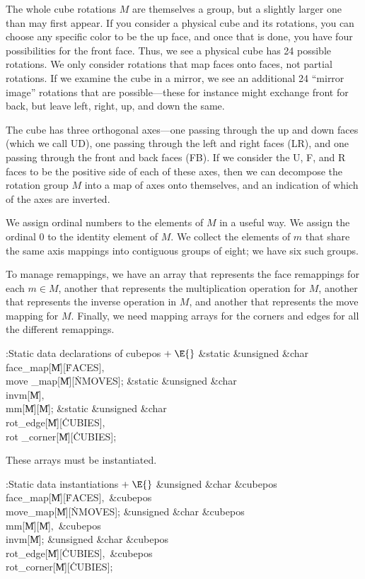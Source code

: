 The whole cube rotations $M$ are themselves a group, but a slightly
larger one than may first appear.  If you consider a physical cube and
its rotations, you can choose any specific color to be the up face,
and once that is done, you have four possibilities for the front face.
Thus, we see a physical cube has 24 possible rotations.  We only
consider rotations that map faces onto faces, not partial rotations.
If we examine the cube in a mirror, we see an additional 24 ``mirror
image'' rotations that are possible---these for instance might
exchange front for back, but leave left, right, up, and down the same.

The cube has three orthogonal axes---one passing through the up and
down faces (which we call UD), one passing through the left and right
faces (LR), and one passing through the front and back faces (FB).  If
we consider the U, F, and R faces to be the positive side of each of
these axes, then we can decompose the rotation group $M$ into a map of
axes onto themselves, and an indication of which of the axes are
inverted.

We assign ordinal numbers to the elements of $M$ in a useful way.  We
assign the ordinal 0 to the identity element of $M$.  We collect the
elements of $m$ that share the same axis mappings into contiguous
groups of eight; we have six such groups.

To manage remappings, we have an array that represents the face
remappings for each $m\in M$, another that represents the
multiplication operation for $M$, another that represents the inverse
operation in $M$, and another that represents the move mapping for
$M$.  Finally, we need mapping arrays for the corners and edges for
all the different remappings.

\Y\B\4:Static data declarations of cubepos\X${}\mathrel+\E{}$\6
\&{static} \&{unsigned} \&{char} \\{face\_map}[\|M][\.{FACES}]${},{}$ \\{move%
\_map}[\|M][\.{NMOVES}];\6
\&{static} \&{unsigned} \&{char} \\{invm}[\|M]${},{}$ \\{mm}[\|M][\|M];\6
\&{static} \&{unsigned} \&{char} \\{rot\_edge}[\|M][\.{CUBIES}]${},{}$ \\{rot%
\_corner}[\|M][\.{CUBIES}];\par
\fi

These arrays must be instantiated.

\Y\B\4:Static data instantiations\X${}\mathrel+\E{}$\6
\&{unsigned} \&{char} \&{cubepos}\DC\\{face\_map}[\|M][\.{FACES}]${},{}$ %
\&{cubepos}\DC\\{move\_map}[\|M][\.{NMOVES}];\6
\&{unsigned} \&{char} \&{cubepos}\DC\\{mm}[\|M][\|M]${},{}$ \&{cubepos}\DC%
\\{invm}[\|M];\6
\&{unsigned} \&{char} \&{cubepos}\DC\\{rot\_edge}[\|M][\.{CUBIES}]${},{}$ %
\&{cubepos}\DC\\{rot\_corner}[\|M][\.{CUBIES}];\par
\fi

